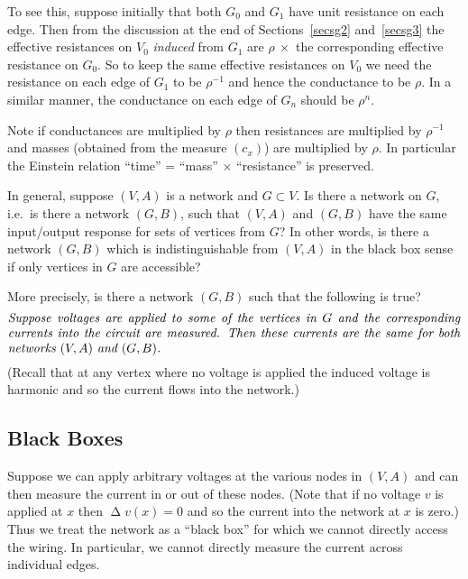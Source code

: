 \documentclass[a4paper]{amsart}
\theoremstyle{plain}
\theoremstyle{definition}
\theoremstyle{remark}
\DeclareMathOperator{\lap}{\Delta}
\begin{document}
To  see this, suppose initially that both $ G_0 $ and $ G_1 $ have unit resistance on each edge.  Then from the discussion at the end of  Sections~\ref{secsg2} and~\ref{secsg3} the effective resistances on $ V_0$ \emph{induced} from $ G_1 $ are $ \rho\  \times$ the corresponding effective resistance on $G_0 $.   So to keep the same effective  resistances on $ V_0 $  we need the resistance on each edge of $ G_1 $ to be $ \rho^{-1} $ and hence the conductance to be $ \rho $.   
In a similar manner, the conductance on each edge of $ G_n $ should be $ \rho^n $.

 Note if  conductances are multiplied by $ \rho $ then resistances are multiplied by $ \rho^{-1} $ and masses (obtained from the measure  $ (c_x) $) are multiplied by 
 $ \rho $.   In particular the Einstein relation ``time'' = ``mass'' $ \times $  ``resistance''    is preserved.

\medskip
In general, suppose $ (V,A) $ is a network and $ G\subset V $.   Is there a network on $ G $, i.e.\ is there a network $ (G,B) $, such that $ (V,A) $ and $ (G,B) $ have the same input/output response for sets of vertices from $ G $?  In other words, is there a network $ (G,B) $ which is indistinguishable from $ (V,A) $ in the black box sense if only vertices in $ G $ are accessible?

More precisely, is there a network $ (G,B) $ such that the following is true? 
\begin{equation} \label{rqm}
\parbox{5in}{\emph{Suppose voltages are applied to some of the vertices in $ G $ and the corresponding currents into the circuit are measured. Then these currents are the same for both networks $ (V,A)$ and $ (G,B) $.}}
\end{equation} 
 (Recall that at any vertex where no voltage is applied the induced voltage is harmonic and so  the current flows into the network.)


\subsection{Black Boxes} \label{secbb}

Suppose we can apply arbitrary voltages at the various nodes in $ (V,A) $  and  can then measure the current in or out of these nodes.   (Note that if no voltage $ v $ is applied at $ x $ then $ \lap v(x) = 0 $ and so the current into the network at $ x $ is zero.)     Thus we treat  the network as a ``black box'' for which we  cannot directly access the wiring.  In particular, we cannot directly measure the current across individual edges.
\end{document}
